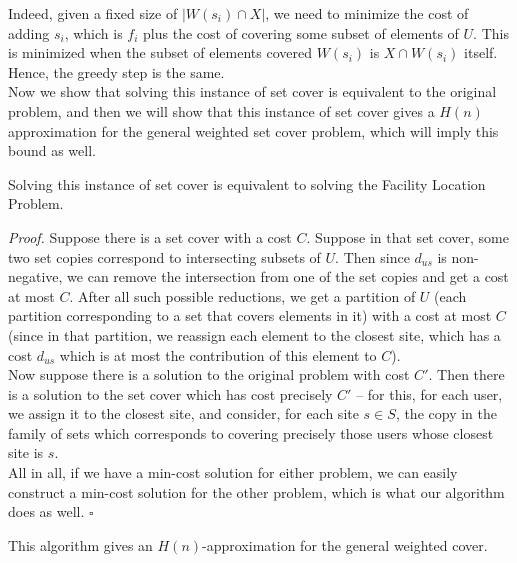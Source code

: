 \documentclass[a4paper]{article}
\newenvironment{proof}{\begin{breakbox}\textit{Proof.}}{\hfill$\square$\end{breakbox}}
\newcommand{\nl}{\vspace{0.2cm}\\}
\begin{document}
Indeed, given a fixed size of $|W(s_i) \cap X|$, we need to minimize the cost of adding $s_i$, which is $f_i$ plus the cost of covering some subset of elements of $U$. This is minimized when the
subset of elements covered $W(s_i)$ is $X \cap W(s_i)$ itself. Hence, the greedy step is the same.\nl
Now we show that solving this instance of set cover is equivalent to the original problem, and then we will show that this instance of set cover gives a $H(n)$ approximation for the
general weighted set cover problem, which will imply this bound as well.\nl
\begin{claim}
    Solving this instance of set cover is equivalent to solving the Facility Location Problem.
\end{claim}
\begin{proof}
    Suppose there is a set cover with a cost $C$. Suppose in that set cover, some two set copies correspond to intersecting subsets of $U$. Then since $d_{us}$ is non-negative, we can remove
    the intersection from one of the set copies and get a cost at most $C$. After all such possible reductions, we get a partition of $U$ (each partition corresponding to a set that covers elements
    in it) with a cost at most $C$ (since in that partition, we reassign each element to the closest site, which has a cost $d_{us}$ which is at most the contribution of this element to $C$).\nl
    Now suppose there is a solution to the original problem with cost $C'$. Then there is a solution to the set cover which has cost precisely $C'$ -- for this, for each user, we assign it to
    the closest site, and consider, for each site $s \in S$, the copy in the family of sets which corresponds to covering precisely those users whose closest site is $s$.\nl
    All in all, if we have a min-cost solution for either problem, we can easily construct a min-cost solution for the other problem, which is what our algorithm does as well.
\end{proof}
\begin{claim}
    This algorithm gives an $H(n)$-approximation for the general weighted cover.
\end{claim}
\end{document}
